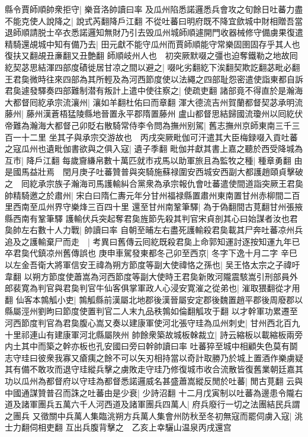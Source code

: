 縣令賈師順帥衆拒守|{
	樂音洛帥讀曰率}
及瓜州陷悉諾邏悉兵會攻之旬餘日吐蕃力盡不能克使人說降之|{
	說式芮翻降戶江翻}
不從吐蕃曰明府既不降宜歛城中財相贈吾當退師順請脱士卒衣悉諾邏知無財乃引去毁瓜州城師順遽開門收器械修守備虜果復遣精騎還覘城中知有備乃去|{
	田元獻不能守瓜州而賈師順能守常樂固圉固存乎其人也復扶又翻覘丑亷翻又丑艶翻}
師順岐州人也　初突厥默啜之彊也迫奪鐵勒之地故囘紇契苾思結渾四部度磧徙居甘凉之間以避之|{
	啜叱劣翻紇下涘翻契欺訖翻苾毗必翻}
王君㚟微時往來四部為其所輕及為河西節度使以法繩之四部耻怨密遣使詣東都自訴君㚟遽發驛奏四部難制潜有叛計上遣中使往察之|{
	使疏吏翻}
諸部竟不得直於是瀚海大都督囘紇承宗流瀼州|{
	瀼如羊翻杜佑曰而章翻}
渾大德流吉州賀蘭都督契苾承明流藤州|{
	藤州漢蒼梧猛陵縣地晉置永平郡隋置藤州}
盧山都督思結歸國流瓊州以囘紇伏帝難為瀚海大都督己卯貶右散騎常侍李令問為撫州别駕|{
	舊志撫州京師東南三千三百一十二里}
坐其子與承宗交游故也　丙戌突厥毗伽可汗遣其大臣梅録啜入貢吐蕃之寇瓜州也遺毗伽書欲與之俱入寇|{
	遺子季翻}
毗伽并獻其書上嘉之聽於西受降城為互市|{
	降戶江翻}
每歲齎縑帛數十萬匹就市戎馬以助軍旅且為監牧之種|{
	種章勇翻}
由是國馬益壯焉　閏月庚子吐蕃贊普與突騎施蘇禄圍安西城安西副大都護趙頤貞擊破之　囘紇承宗族子瀚海司馬護輸糾合黨衆為承宗報仇會吐蕃遣使間道詣突厥王君㚟帥精騎邀之於肅州|{
	宋白曰隋仁夀元年分甘州福禄縣置肅州東南置甘州赤柳間二百里西南至瓜州界守樂烽三百四十里}
還至甘州南鞏筆驛|{
	為于偽翻間古莧翻甘州張掖縣西南有鞏筆驛}
護輸伏兵突起奪君㚟旌節先殺其判官宋貞剖其心曰始謀者汝也君㚟帥左右數十人力戰|{
	帥讀曰率}
自朝至晡左右盡死護輸殺君㚟載其尸奔吐蕃凉州兵追及之護輸棄尸而走　|{
	考異曰舊傳云囘紇既殺君㚟上命郭知運討逐按知運九年已卒君㚟代鎮凉州舊傳誤也}
庚申車駕發東都冬己卯至西京|{
	冬字下逸十月二字}
辛巳以左金吾衛大將軍信安王禕為朔方節度等副大使禕恪之孫也|{
	吴王恪太宗之子禕吁韋翻}
以朔方節度使蕭嵩為河西節度等副大使時王君㚟新敗河隴震駭嵩引刑部員外郎裴寛為判官與君㚟判官牛仙客俱掌軍政人心浸安寛漼之從弟也|{
	漼取猥翻從才用翻}
仙客本鶉觚小吏|{
	鶉觚縣前漢屬北地郡後漢晉屬安定郡後魏置趙平郡後周廢郡以縣屬涇州劉昫曰節度使置判官二人末九品秩鶉如倫翻觚攻于翻}
以才幹軍功累遷至河西節度判官為君㚟腹心嵩又奏以建康軍使河北張守珪為瓜州刺史|{
	甘州西北百九十里祁連山有建康軍河北縣屬陜州}
帥餘衆築故城板榦裁立|{
	詩云縮板以載縮板兩旁内土其中而築之幹亦板也孔安國曰旁曰幹帥讀曰率}
吐蕃猝至城中相顧失色莫有鬬志守珪曰彼衆我寡又瘡痍之餘不可以矢刃相持當以奇計取勝乃於城上置酒作樂虜疑其有備不敢攻而退守珪縱兵擊之虜敗走守珪乃修復城市收合流散皆復舊業朝廷嘉其功以瓜州為都督府以守珪為都督悉諾邏威名甚盛蕭嵩縱反閒於吐蕃|{
	閒古莧翻}
云與中國通謀贊普召而誅之吐蕃由是少衰|{
	少詩沼翻}
十二月戊寅制以吐蕃為邊患令隴右道及諸軍團兵五萬六千人河西道及諸軍團兵四萬人|{
	府兵廢行一切之法團結民兵謂之團兵}
又徵關中兵萬人集臨洮朔方兵萬人集會州防秋至冬初無寇而罷伺虜入寇|{
	洮士力翻伺相吏翻}
互出兵腹背擊之　乙亥上幸驪山温泉丙戌還宫

